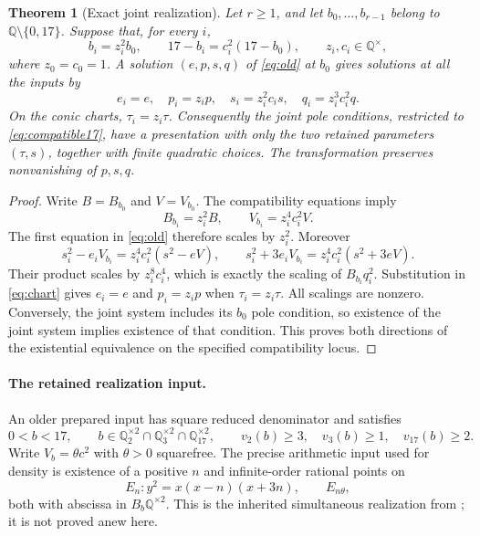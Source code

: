 \documentclass[11pt,a4paper]{article}
\newtheorem{theorem}{Theorem}[section]
\theoremstyle{definition}\newtheorem{definition}[theorem]{Definition}
\theoremstyle{remark}\newtheorem{remark}[theorem]{Remark}
\newcommand{\Q}{\mathbb Q}\newcommand{\Z}{\mathbb Z}
\begin{document}
\begin{theorem}[Exact joint realization]\label{thm:old}
Let $r\ge1$, and let $b_0,\ldots,b_{r-1}$ belong to
$\Q\setminus\{0,17\}$. Suppose that, for every $i$,
\begin{equation}\label{eq:compatible17}
 b_i=z_i^2b_0,\qquad 17-b_i=c_i^2(17-b_0),
 \qquad z_i,c_i\in\Q^\times,
\end{equation}
where $z_0=c_0=1$. A solution $(e,p,s,q)$ of
\eqref{eq:old} at $b_0$ gives solutions at all the inputs by
\begin{equation}\label{eq:oldtransfer}
 e_i=e,\quad p_i=z_ip,\quad s_i=z_i^2c_i s,
 \quad q_i=z_i^3c_i^2q.
\end{equation}
On the conic charts, $\tau_i=z_i\tau$.
Consequently the joint pole conditions, restricted to
\eqref{eq:compatible17}, have a presentation with only the two retained
parameters $(\tau,s)$, together with finite quadratic choices.
The transformation preserves nonvanishing of $p,s,q$.
\end{theorem}
\begin{proof}
Write $B=B_{b_0}$ and $V=V_{b_0}$. The compatibility equations imply
\[
 B_{b_i}=z_i^2B,\qquad V_{b_i}=z_i^4c_i^2V.
\]
The first equation in \eqref{eq:old} therefore scales by $z_i^2$.
Moreover
\[
 s_i^2-e_iV_{b_i}=z_i^4c_i^2(s^2-eV),\qquad
 s_i^2+3e_iV_{b_i}=z_i^4c_i^2(s^2+3eV).
\]
Their product scales by $z_i^8c_i^4$, which is exactly the scaling of
$B_{b_i}q_i^2$. Substitution in \eqref{eq:chart} gives $e_i=e$ and
$p_i=z_ip$ when $\tau_i=z_i\tau$. All scalings are nonzero.
Conversely, the joint system includes its $b_0$ pole condition, so
existence of the joint system implies existence of that condition.
This proves both directions of the existential equivalence on the
specified compatibility locus.
\end{proof}

\paragraph{The retained realization input.}
An older prepared input has square reduced denominator and satisfies
\[
 0<b<17,\qquad b\in\Q_2^{\times2}\cap\Q_3^{\times2}\cap\Q_{17}^{\times2},
 \qquad v_2(b)\ge3,\quad v_3(b)\ge1,\quad v_{17}(b)\ge2.
\]
Write $V_b=\theta c^2$ with $\theta>0$ squarefree. The precise
arithmetic input used for density is existence of a positive $n$ and
infinite-order rational points on
\[
 E_n:y^2=x(x-n)(x+3n),\qquad E_{n\theta},
\]
both with abscissa in $B_b\Q^{\times2}$. This is the inherited
simultaneous realization from \cite{Density}; it is not proved anew here.
\end{document}

